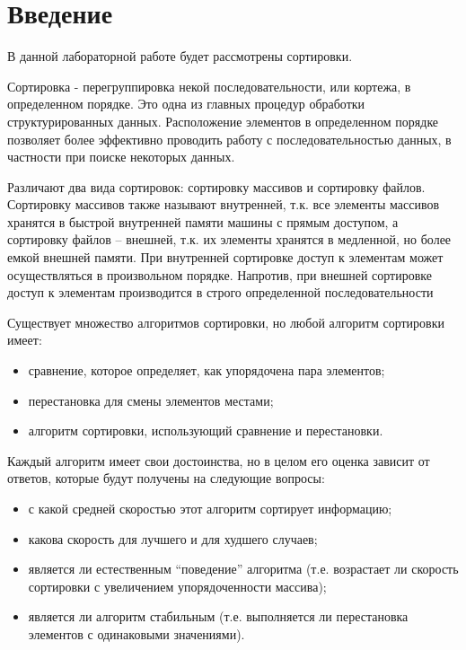 \chapter*{Введение}

В данной лабораторной работе будет рассмотрены сортировки. 

Сортировка - перегруппировка некой последовательности, или кортежа, в определенном порядке. Это одна из главных процедур обработки структурированных данных. Расположение элементов в определенном порядке позволяет более эффективно проводить работу с последовательностью данных, в частности при поиске некоторых данных.

Различают два вида сортировок: сортировку массивов и сортировку файлов. Сортировку массивов также называют внутренней, т.к. все элементы массивов хранятся в быстрой внутренней памяти машины с прямым доступом, а сортировку файлов – внешней, т.к. их элементы хранятся в медленной, но более емкой внешней памяти. При внутренней сортировке доступ к элементам может осуществляться в
произвольном порядке. Напротив, при внешней сортировке доступ к элементам производится в строго определенной последовательности

Существует множество алгоритмов сортировки, но любой алгоритм сортировки имеет:
\begin{itemize}
	\item сравнение, которое определяет, как упорядочена пара элементов;
	\item перестановка для смены элементов местами;
	\item алгоритм сортировки, использующий сравнение и перестановки.
\end{itemize}

Каждый алгоритм имеет свои достоинства, но в целом его оценка зависит от ответов, которые будут получены на следующие вопросы:
\begin{itemize}
	\item с какой средней скоростью этот алгоритм сортирует информацию;
	\item какова скорость для лучшего и для худшего случаев;
	\item является ли естественным “поведение” алгоритма (т.е. возрастает ли скорость сортировки с увеличением упорядоченности массива);
	\item является ли алгоритм стабильным (т.е. выполняется ли перестановка элементов с одинаковыми значениями).
\end{itemize}

